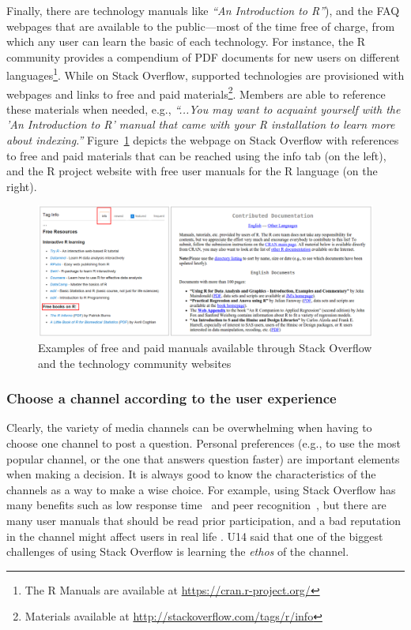 \documentclass{sig-alternate-05-2015}
\begin{document}
		Finally, there are technology manuals like \textit{``An Introduction to R''}), and the FAQ webpages that are available to the public---most of the time free of charge, from which any user can learn the basic of each technology.
		For instance, the R community provides a compendium of PDF documents for new users on different languages\footnote{The R Manuals are available at \url{https://cran.r-project.org/}}.
		While on Stack Overflow, supported technologies are provisioned with webpages and links to free and paid materials\footnote{Materials available at \url{http://stackoverflow.com/tags/r/info}}.
		Members are able to reference these materials when needed, e.g., \textit{``...You may want to acquaint yourself with the 'An Introduction to R' manual that came with your R installation to learn more about indexing.''}
		Figure~\ref{fig:RManuals} depicts the webpage on Stack Overflow with references to free and paid materials that can be reached using the info tab (on the left), and the R project website with free user manuals for the R language (on the right).

		\begin{figure} [!htb]
			\centering
			\includegraphics[width=1\columnwidth]{Figures/RManuals}
			\caption{Examples of free and paid manuals available through Stack Overflow and the technology community websites}
			\label{fig:RManuals}
		\end{figure}

	\subsubsection{Choose a channel according to the user experience}

		Clearly, the variety of media channels can be overwhelming when having to choose one channel to post a question.
		Personal preferences (e.g., to use the most popular channel, or the one that answers question faster) are important elements when making a decision.
		It is always good to know the characteristics of the channels as a way to make a wise choice.
		For example, using Stack Overflow has many benefits such as low response time~\cite{Mamykina2011} and peer recognition~\cite{Singer2013}, but there are many user manuals that should be read prior participation, and a bad reputation in the channel might affect users in real life \cite{Singer2013}.
		U14 said that one of the biggest challenges of using Stack Overflow is learning the \emph{ethos} of the channel.
\end{document}
